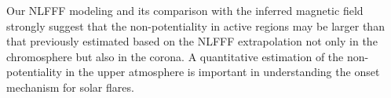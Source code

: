 \documentclass[manuscript]{aastex61}
\begin{document}
Our NLFFF modeling and its comparison with the inferred magnetic field strongly suggest that the non-potentiality in active regions may be larger than that previously estimated based on the NLFFF extrapolation not only in the chromosphere but also in the corona. 
A quantitative estimation of the non-potentiality in the upper atmosphere is important in understanding the onset mechanism for solar flares.
\end{document}
